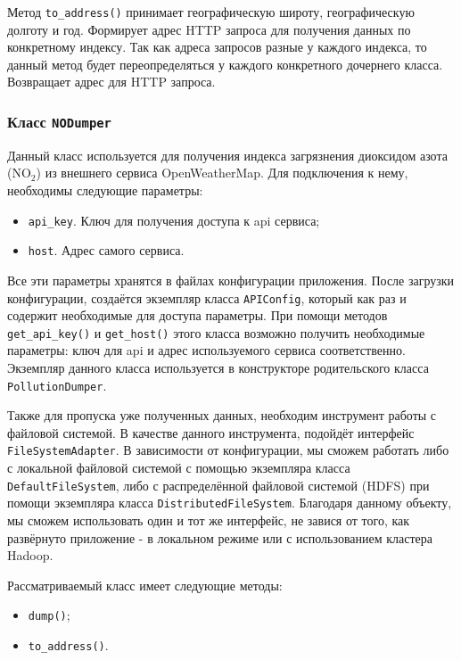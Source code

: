 Метод \texttt{to\_address()} принимает географическую широту, географическую долготу и год.
Формирует адрес HTTP запроса для получения данных по конкретному индексу.
Так как адреса запросов разные у каждого индекса, то данный метод будет переопределяться у каждого конкретного дочернего класса.
Возвращает адрес для HTTP запроса.



\subsubsection{Класс \texttt{NODumper}}
Данный класс используется для получения индекса загрязнения диоксидом азота ($ \text{NO}_{\text{2}} $) из внешнего сервиса OpenWeatherMap.
Для подключения к нему, необходимы следующие параметры:

\begin{itemize}
\item \texttt{api\_key}. Ключ для получения доступа к api сервиса;
\item \texttt{host}. Адрес самого сервиса.
\end{itemize}

Все эти параметры хранятся в файлах конфигурации приложения.
После загрузки конфигурации, создаётся экземпляр класса \texttt{APIConfig}, который как раз и содержит необходимые для доступа параметры.
При помощи методов \texttt{get\_api\_key()} и \texttt{get\_host()} этого класса возможно получить необходимые параметры: ключ для api и адрес используемого сервиса соответственно.
Экземпляр данного класса используется в конструкторе родительского класса \texttt{PollutionDumper}.

Также для пропуска уже полученных данных, необходим инструмент работы с файловой системой.
В качестве данного инструмента, подойдёт интерфейс \texttt{FileSystemAdapter}.
В зависимости от конфигурации, мы сможем работать либо с локальной файловой системой с помощью экземпляра класса \texttt{DefaultFileSystem}, либо с распределённой файловой системой (HDFS) при помощи экземпляра класса \texttt{DistributedFileSystem}.
Благодаря данному объекту, мы сможем использовать один и тот же интерфейс, не завися от того, как развёрнуто приложение - в локальном режиме или с использованием кластера Hadoop.

Рассматриваемый класс имеет следующие методы:
\begin{itemize}
\item \texttt{dump()};
\item \texttt{to\_address()}.
\end{itemize}

